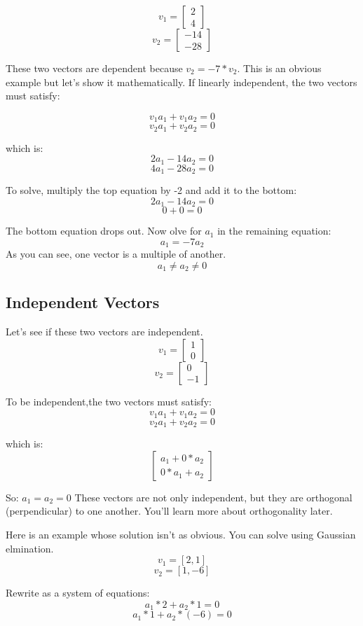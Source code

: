 $$v_1 = \begin{bmatrix}
			2 \\
			4
		\end{bmatrix}$$
$$v_2 = \begin{bmatrix}
			-14 \\
			-28
\end{bmatrix}$$

These two vectors are dependent because $v_2 = -7*v_2$. This is an obvious example but let's show it mathematically. If linearly independent, the two vectors must satisfy:

	$$v_1a_1 + v_1a_2 = 0$$
	$$v_2a_1 + v_2a_2 = 0$$

which is:
	$$2a_1 -14a_2 = 0$$
	$$4a_1 -28a_2 = 0$$

To solve, multiply the top equation by -2 and add it to the bottom: 
$$2a_1 -14a_2 = 0 $$
$$ 0  + 0     = 0 $$

The bottom equation drops out. Now  olve for $a_1$ in the remaining equation:
$$a_1 = -7a_2$$
As you can see, one vector is a multiple of another. $$a_1 \neq a_2 \neq 0$$

\subsection{Independent Vectors}
Let's see if these two vectors are independent.
$$v_1 = \begin{bmatrix}
1 \\
0
\end{bmatrix}$$
$$v_2 = \begin{bmatrix}
0 \\
-1
\end{bmatrix}$$

To be independent,the two vectors must satisfy:
	$$v_1a_1 + v_1a_2 = 0$$
	$$v_2a_1 + v_2a_2 = 0$$
	
which is:
$$\begin{bmatrix}
	a_1 + 0*a_2 \\
	0*a_1 + a_2
\end{bmatrix}$$

So:
$a_1 = a_2 = 0$
These vectors are not only independent, but they are orthogonal (perpendicular) to one another. You'll learn more about orthogonality later.

Here is an example whose solution isn't as obvious. You can solve using Gaussian elmination.
$$v_1 = [2,1]$$
$$v_2 = [1,-6]$$

Rewrite as a system of equations:
$$a_1*2 + a_2*1 = 0 $$
$$a_1*1 + a_2*(-6) = 0$$

